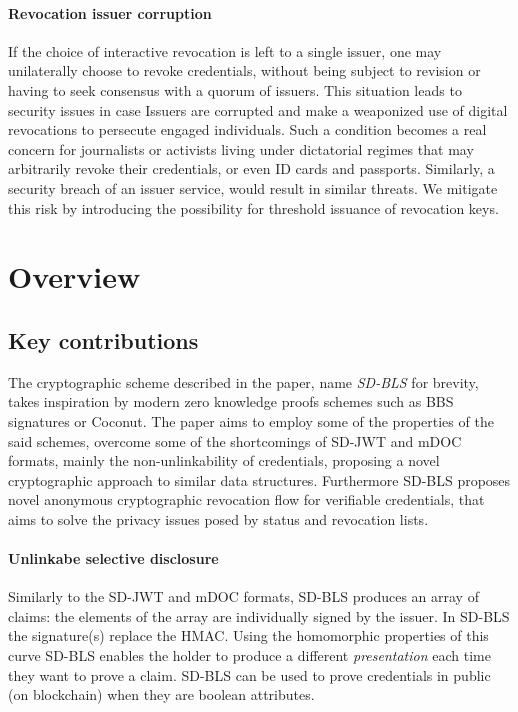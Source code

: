 

\paragraph{Revocation issuer corruption}

If the choice of interactive revocation is left to a single issuer, one may unilaterally choose to revoke credentials, without being subject to revision or having to seek consensus with a quorum of issuers. This situation leads to security issues in case Issuers are corrupted and make a weaponized use of digital revocations to persecute engaged individuals. Such a condition becomes a real concern for journalists or activists living under dictatorial regimes that may arbitrarily revoke their credentials, or even ID cards and passports. Similarly, a security breach of an issuer service, would result in similar threats. We mitigate this risk by introducing the possibility for threshold issuance of revocation keys.

\section{Overview}

\subsection{Key contributions}
The  cryptographic scheme described in the paper, name \textit{SD-BLS} for brevity,  takes inspiration by modern zero knowledge proofs schemes  such as \cite{bbs+}BBS signatures or Coconut\cite{coconut}.  The paper aims to employ some of the properties of the said schemes, overcome some of the shortcomings of  SD-JWT and mDOC formats, mainly the non-unlinkability of credentials, proposing a novel cryptographic approach to similar data structures. Furthermore SD-BLS proposes novel anonymous cryptographic revocation flow for verifiable credentials, that aims to solve the privacy issues posed by status and revocation lists.

\paragraph{Unlinkabe selective disclosure}
Similarly to the SD-JWT and mDOC formats, SD-BLS produces an array of claims:  the elements of the array are individually signed by the issuer. In SD-BLS the signature(s) replace the HMAC. Using the homomorphic properties of this curve SD-BLS enables the holder to produce a different \textit{presentation} each time they want to prove a claim. SD-BLS can be used to prove credentials in public (on blockchain) when they are boolean attributes.

